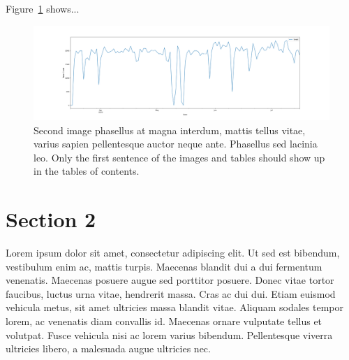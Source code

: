 Figure~\ref{fig:figure2} shows...

\begin{figure}[h!]
\centering
\includegraphics[scale=0.3]{Figs/Fig2.png}
\caption[Second image phasellus at magna interdum, mattis tellus vitae, varius sapien pellentesque auctor neque ante]
{Second image phasellus at magna interdum, mattis tellus vitae, varius sapien pellentesque auctor neque ante. Phasellus sed lacinia leo. Only the first sentence of the images and tables should show up in the tables of contents.}
\label{fig:figure2}
\end{figure}


\section*{Section 2} 

Lorem ipsum dolor sit amet, consectetur adipiscing elit. Ut sed est bibendum, vestibulum enim ac, mattis turpis. Maecenas blandit dui a dui fermentum venenatis. Maecenas posuere augue sed porttitor posuere. Donec vitae tortor faucibus, luctus urna vitae, hendrerit massa. Cras ac dui dui. Etiam euismod vehicula metus, sit amet ultricies massa blandit vitae. Aliquam sodales tempor lorem, ac venenatis diam convallis id. Maecenas ornare vulputate tellus et volutpat. Fusce vehicula nisi ac lorem varius bibendum. Pellentesque viverra ultricies libero, a malesuada augue ultricies nec.


